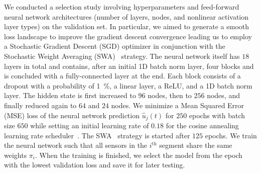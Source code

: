 We conducted a selection study involving hyperparameters and feed-forward neural network architectures (number of layers, nodes, and nonlinear activation layer types) on the validation set. %
In particular, we aimed to generate a smooth loss landscape to improve the gradient descent convergence leading us to employ a Stochastic Gradient Descent (SGD) %
optimizer in conjunction with the Stochastic Weight Averaging (SWA)~\citep{izmailov2018averaging} strategy.
The neural network itself %
has $18$ layers in total and contains, after an initial 1D batch norm layer, four blocks and is concluded with a fully-connected layer at the end. Each block consists of a dropout with a probability of \SI{1}{\percent}, a linear layer, a ReLU, and a 1D batch norm layer. The hidden state is first increased to $96$ nodes, then to $256$ nodes, and finally reduced again to $64$ and $24$ nodes.
We minimize a Mean Squared Error (MSE) loss of the neural network prediction $\hat{u}_j(t)$ for $250$ epochs with batch size $650$ while setting an initial learning rate of $0.18$ for the cosine annealing learning rate scheduler~\citep{loshchilov2016sgdr}. The SWA~\citep{izmailov2018averaging} strategy is started after $125$ epochs.
We train the neural network such that all sensors in the $i^\mathrm{th}$ segment share the same weights $\pi_i$.
When the training is finished, we select the model from the epoch with the lowest validation loss and save it for later testing.

